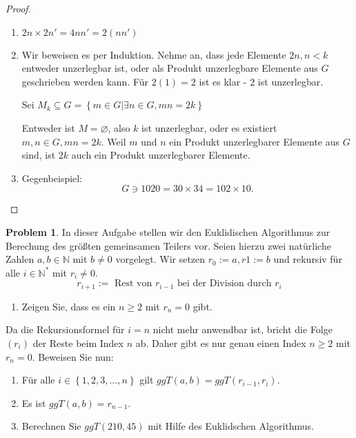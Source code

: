 \documentclass[prb,12pt]{revtex4-2}
\theoremstyle{definition}
\newtheorem{Problem}{Problem}
\theoremstyle{definition}
\newenvironment{parts}{\begin{enumerate}[label=(\alph*)]}{\end{enumerate}}
\newcommand{\N}{\mathbb{N}}
\begin{document}
\begin{proof}
	\begin{parts}
	\item $2n\times 2n'=4nn'=2(nn')$
	\item Wir beweisen es per Induktion. Nehme an, dass jede Elemente  $2n, n < k$ entweder unzerlegbar ist, oder als Produkt unzerlegbare Elemente aus $G$ geschrieben werden kann. F\"{u}r $2(1)=2$ ist es klar - $2$ ist unzerlegbar.
		
		Sei $M_k\subseteq G =\left\{ m\in G| \exists n\in G, mn=2k\right\} $
		
		Entweder ist $M=\varnothing$, also $k$ ist unzerlegbar, oder es existiert $m,n\in G, mn=2k$. Weil $m$ und $n$ ein Produkt unzerlegbarer Elemente aus $G$ sind, ist $2k$ auch ein Produkt unzerlegbarer Elemente.
	\item Gegenbeispiel:
		\[
		G\ni 1020=30\times 34=102\times 10
		.\] 
	\end{parts}
\end{proof}
\begin{Problem}
	In dieser Aufgabe stellen wir den Euklidischen Algorithmus zur Berechung des größten gemeinsamen Teilers vor. Seien hierzu zwei natürliche Zahlen $a, b \in \N$ mit $b \neq 0$ vorgelegt. Wir setzen $r_0 := a, r1 := b$ und rekursiv für alle $i \in \N^*$ mit $r_i \neq 0$.
		\[r_{i+1}:=\text{ Rest von }r_{i-1}\text{ bei der Division durch }r_i\]
	\begin{enumerate}[label=(\alph*)]
	\item	Zeigen Sie, dass es ein $n\ge 2$ mit  $r_n=0$ gibt.
	\end{enumerate}	
Da die Rekursionsformel für $i = n$ nicht mehr anwendbar ist, bricht die Folge $(r_i)$ der Reste beim Index $n$ ab. Daher gibt es nur genau einen Index $n \ge 2$ mit $r_n = 0$. Beweisen Sie nun:
\begin{enumerate}[resume*]
\item F\"{u}r alle $i\in \left\{ 1,2,3,\dots,n \right\} $ gilt $ggT(a,b)=ggT(r_{i-1},r_i)$.
\item Es ist $ggT(a,b)=r_{n-1}$.
\item Berechnen Sie $ggT(210,45)$ mit Hilfe des Euklidschen Algorithmus.
\end{enumerate}
\end{Problem}
\end{document}
